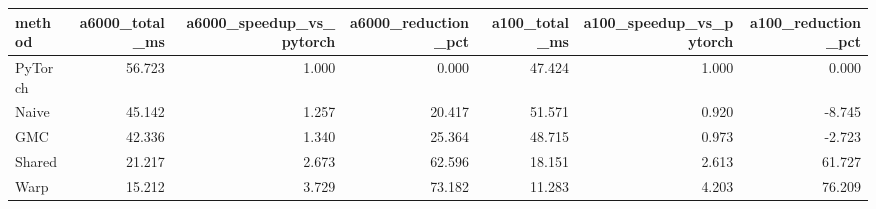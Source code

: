 \begin{tabular}{lrrrrrr}
\toprule
method & a6000_total_ms & a6000_speedup_vs_pytorch & a6000_reduction_pct & a100_total_ms & a100_speedup_vs_pytorch & a100_reduction_pct \\
\midrule
PyTorch & 56.723 & 1.000 & 0.000 & 47.424 & 1.000 & 0.000 \\
Naive & 45.142 & 1.257 & 20.417 & 51.571 & 0.920 & -8.745 \\
GMC & 42.336 & 1.340 & 25.364 & 48.715 & 0.973 & -2.723 \\
Shared & 21.217 & 2.673 & 62.596 & 18.151 & 2.613 & 61.727 \\
Warp & 15.212 & 3.729 & 73.182 & 11.283 & 4.203 & 76.209 \\
\bottomrule
\end{tabular}
